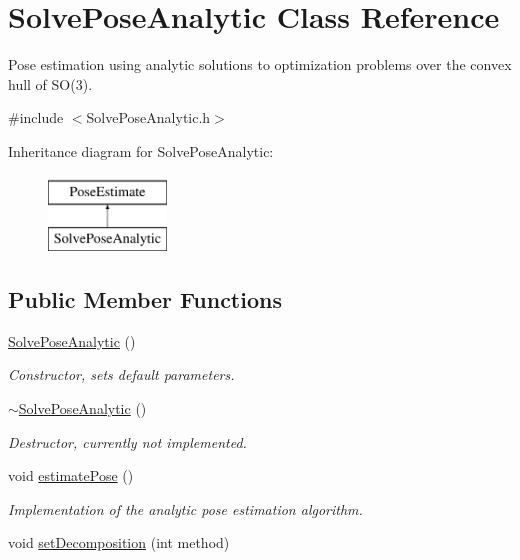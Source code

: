\hypertarget{classSolvePoseAnalytic}{\section{\-Solve\-Pose\-Analytic \-Class \-Reference}
\label{classSolvePoseAnalytic}
}


\-Pose estimation using analytic solutions to optimization problems over the convex hull of \-S\-O(3).  




{\ttfamily \#include $<$\-Solve\-Pose\-Analytic.\-h$>$}

\-Inheritance diagram for \-Solve\-Pose\-Analytic\-:\begin{figure}[H]
\begin{center}
\leavevmode
\includegraphics[height=2.000000cm]{classSolvePoseAnalytic}
\end{center}
\end{figure}
\subsection*{\-Public \-Member \-Functions}
\begin{DoxyCompactItemize}
\item 
\hyperlink{classSolvePoseAnalytic_a46909a99ed0f06e70aa4b9d999c6356b}{\-Solve\-Pose\-Analytic} ()
\begin{DoxyCompactList}\small\item\em \-Constructor, sets default parameters. \end{DoxyCompactList}\item 
\hyperlink{classSolvePoseAnalytic_a0bce3ad52a52f23cd14eabd7de12d832}{$\sim$\-Solve\-Pose\-Analytic} ()
\begin{DoxyCompactList}\small\item\em \-Destructor, currently not implemented. \end{DoxyCompactList}\item 
void \hyperlink{classSolvePoseAnalytic_a0a3fd0af007d4a945c03f49f820badcf}{estimate\-Pose} ()
\begin{DoxyCompactList}\small\item\em \-Implementation of the analytic pose estimation algorithm. \end{DoxyCompactList}\item 
void \hyperlink{classSolvePoseAnalytic_aff3d9a1a6c15b4076d8fc560fd18176c}{set\-Decomposition} (int method)
\end{DoxyCompactItemize}
